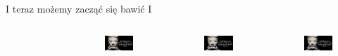 \documentclass[handout]{beamer}
\begin{document}
\begin{frame}{I teraz możemy zacząć się bawić I}{}
\begin{columns}
\begin{figure}
    \end{figure}
    \begin{figure}
        \centering
        \includegraphics[width=0.75\linewidth]{mem3}
    \end{figure}
    \begin{figure}
        \centering
        \includegraphics[width=0.5\linewidth]{mem3}
    \end{figure}
    \begin{figure}
        \centering
        \includegraphics[width=0.25\linewidth]{mem3}
    \end{figure}
 \end{columns} 
\end{frame}
\end{document}
